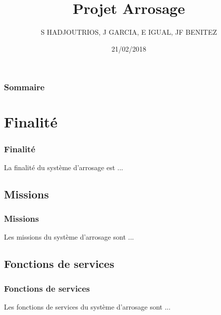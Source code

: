 \documentclass{beamer}
\title{Projet Arrosage}
\author{S HADJOUTRIOS, J GARCIA, E IGUAL, JF BENITEZ} %
\institute{CNAM}
\date{21/02/2018}
\begin{document}
\begin{frame}[plain]
  \titlepage
\end{frame}

\begin{frame}
  \frametitle{Sommaire}
  \tableofcontents
\end{frame}

\section{Finalité}
\begin{frame}[label=finalite]
  \frametitle{Finalité}
  \rightskip=0pt\leftskip=0pt
  La finalité du système d'arrosage est ...
\end{frame}

\subsection{Missions}
\begin{frame}[label=missions]
  \frametitle{Missions}
  \rightskip=0pt\leftskip=0pt
  Les missions du système d'arrosage sont ...
\end{frame}

\subsection{Fonctions de services}
\begin{frame}[label=fonctionsdeservices]
  \frametitle{Fonctions de services}
  \rightskip=0pt\leftskip=0pt
  Les fonctions de services du système d'arrosage sont ...
\end{frame}
\end{document}
